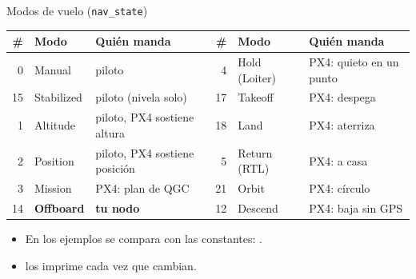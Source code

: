 \begin{frame}{Modos de vuelo (\texttt{nav\_state})}
  \centering\scriptsize
  \begin{tabular}{rll@{\hspace{1.2cm}}rll}
    \toprule
    \# & Modo & Quién manda & \# & Modo & Quién manda \\
    \midrule
    0 & Manual & piloto & 4 & Hold (Loiter) & PX4: quieto en un punto \\
    15 & Stabilized & piloto (nivela solo) & 17 & Takeoff & PX4: despega \\
    1 & Altitude & piloto, PX4 sostiene altura & 18 & Land & PX4: aterriza \\
    2 & Position & piloto, PX4 sostiene posición & 5 & Return (RTL) & PX4: a casa \\
    3 & Mission & PX4: plan de QGC & 21 & Orbit & PX4: círculo \\
    14 & \textbf{Offboard} & \textbf{tu nodo} & 12 & Descend & PX4: baja sin GPS \\
    \bottomrule
  \end{tabular}
  \vspace{0.6em}
  \raggedright\small
  \begin{itemize}
    \item En los ejemplos se compara con las constantes: .
    \item {} los imprime cada vez que cambian.
  \end{itemize}
\end{frame}

